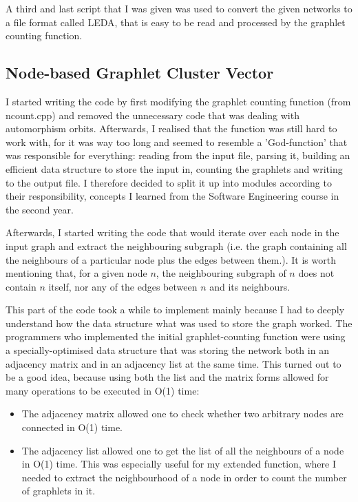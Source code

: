 A third and last script that I was given was used to convert the given networks
to a file format called LEDA, that is easy to be read and processed by the
graphlet counting function.

\subsection{Node-based Graphlet Cluster Vector}

I started writing the code by first modifying the graphlet counting function
(from ncount.cpp) and removed the unnecessary code that was dealing with
automorphism orbits. Afterwards, I realised that the function was still hard to
work with, for it was way too long and seemed to resemble a 'God-function' that
was responsible for everything: reading from the input file, parsing it,
building an efficient data structure to store the input in, counting the
graphlets and writing to the output file. I therefore decided to split it up
into modules according to their responsibility, concepts I learned from the
Software Engineering course in the second year. 

Afterwards, I started writing the code that would iterate over each node in the
input graph and extract the neighbouring subgraph (i.e. the graph containing
all the neighbours of a particular node plus the edges between them.). It is
worth mentioning that, for a given node $n$, the neighbouring subgraph of $n$
does not contain $n$ itself, nor any of the edges between $n$ and its
neighbours. 

This part of the code took a while to implement mainly because I
had to deeply understand how the data structure what was used to store the
graph worked. The programmers who implemented the initial graphlet-counting
function were using a specially-optimised data structure that was storing the
network both in an adjacency matrix and in an adjacency list at the same time.
This turned out to be a good idea, because using both the list and the matrix
forms allowed for many operations to be executed in O(1) time:
\begin{itemize}
 \item The adjacency matrix allowed one to check whether two arbitrary nodes
are connected in O(1) time.
 \item The adjacency list allowed one to get the list of all the neighbours of
a node in O(1) time. This was especially useful for my extended function, where
I needed to extract the neighbourhood of a node in order to count the number of
graphlets in it. 
\end{itemize}

